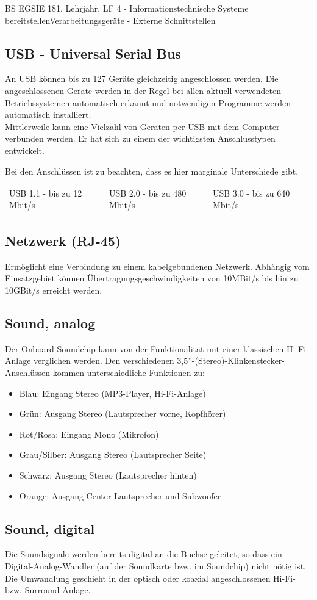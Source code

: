 \documentclass[11pt,oneside,twocolumn,openany,headings=optiontotoc,11pt,numbers=noenddot]{article}
\begin{document}
\begin{worksheet}{BS EGSIE 18}{1. Lehrjahr, LF 4 - Informationstechnische Systeme bereitstellen}{Verarbeitungsgeräte - Externe Schnittstellen}
		\subsection*{USB - Universal Serial Bus}
		An USB können bis zu 127 Geräte gleichzeitig angeschlossen werden. Die angeschlossenen Geräte werden in der Regel bei allen aktuell verwendeten Betriebssystemen automatisch erkannt und notwendigen Programme werden automatisch installiert.\\
		Mittlerweile kann eine Vielzahl von Geräten per USB mit dem Computer verbunden werden. Er hat sich zu einem der wichtigsten Anschlusstypen entwickelt.\\
		\par\noindent
		Bei den Anschlüssen ist zu beachten, dass es hier marginale Unterschiede gibt.\\
		\begin{tabularx}{0.48\textwidth}{MMM}
			USB 1.1 - bis zu 12 Mbit/s & USB 2.0 - bis zu 480 Mbit/s & USB 3.0 - bis zu 640 Mbit/s
		\end{tabularx}
		\subsection*{Netzwerk (RJ-45)}
		Ermöglicht eine Verbindung zu einem kabelgebundenen Netzwerk. Abhängig vom Einsatzgebiet können Übertragungsgeschwindigkeiten von 10MBit/s bis hin zu 10GBit/s erreicht werden.
		\subsection*{Sound, analog}
		Der Onboard-Soundchip kann von der Funktionalität mit einer klassischen Hi-Fi-Anlage verglichen werden. Den verschiedenen 3,5''-(Stereo)-Klinkenstecker-Anschlüssen kommen unterschiedliche Funktionen zu:
		\begin{itemize}
			\item Blau: Eingang Stereo (MP3-Player, Hi-Fi-Anlage)
			\item Grün: Ausgang Stereo (Lautsprecher vorne, Kopfhörer)
			\item Rot/Rosa: Eingang Mono (Mikrofon)
			\item Grau/Silber: Ausgang Stereo (Lautsprecher Seite)
			\item Schwarz: Ausgang Stereo (Lautsprecher hinten)
			\item Orange: Ausgang Center-Lautsprecher und Subwoofer
		\end{itemize}
		\subsection*{Sound, digital}
		Die Soundsignale werden bereits digital an die Buchse geleitet, so dass ein Digital-Analog-Wandler (auf der Soundkarte bzw. im Soundchip) nicht nötig ist.\\
		Die Umwandlung geschieht in der optisch oder koaxial angeschlossenen Hi-Fi- bzw. Surround-Anlage.

\end{worksheet}
\end{document}
